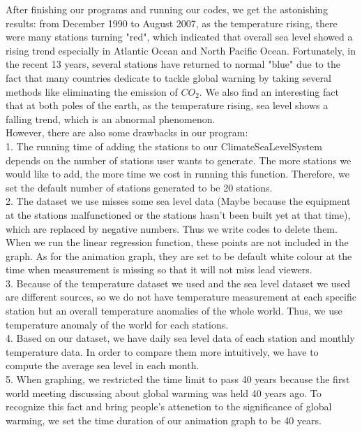 \documentclass[fontsize=11pt]{article}
\begin{document}
    After finishing our programs and running our codes, we get the astonishing results: from December 1990 to August 2007, as the temperature rising, there were many stations turning "red", which indicated that overall sea level showed a rising trend especially in Atlantic Ocean and North Pacific Ocean. Fortunately, in the recent 13 years, several stations have returned to normal "blue" due to the fact that many countries dedicate to tackle global warning by taking several methods like eliminating the emission of $CO_2$. We also find an interesting fact that at both poles of the earth, as the temperature rising, sea level shows a falling trend, which is an abnormal phenomenon.\\
    However, there are also some drawbacks in our program:\\
    1. The running time of adding the stations to our ClimateSeaLevelSystem depends on the number of stations user wants to generate. The more stations we would like to add, the more time we cost in running this function. Therefore, we set the default number of stations generated to be 20 stations.\\
    2. The dataset we use misses some sea level data (Maybe because the equipment at the stations malfunctioned or the stations hasn't been built yet at that time), which are replaced by negative numbers. Thus we write codes to delete them. When we run the linear regression function, these points are not included in the graph. As for the animation graph, they are set to be default white colour at the time when measurement is missing so that it will not miss lead viewers.\\
    3. Because of the temperature dataset we used and the sea level dataset we used are different sources, so we do not have temperature measurement at each specific station but an overall temperature anomalies of the whole world. Thus, we use temperature anomaly of the world for each stations. \\
    4. Based on our dataset, we have daily sea level data of each station and monthly temperature data. In order to compare them more intuitively, we have to compute the average sea level in each month. \\
    5. When graphing, we restricted the time limit to pass 40 years because the first world meeting discussing about global warming was held 40 years ago. To recognize this fact and bring people's attenetion to the significance of global warming, we set the time duration of our animation graph to be 40 years.\\
\end{document}
